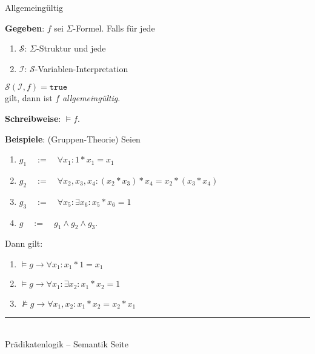 \documentclass{slides}
\newcommand{\myrule}{\rule{20cm}{1mm}\\ }
\newcommand{\struct}{\mathcal{S}}
\newcounter{mypage}
\begin{document}
\begin{slide}{}
\normalsize

\begin{center}
Allgemeing\"{u}ltig
\end{center}
\vspace{0.5cm}

\footnotesize
\textbf{Gegeben}: $f$ sei $\Sigma$-Formel. Falls f\"{u}r jede
\begin{enumerate}
\item $\struct$: \quad  $\Sigma$-Struktur und jede
\item  $\mathcal{I}$: \quad $\struct$-Variablen-Interpretation
\end{enumerate}
\hspace*{1.3cm} $\struct(\mathcal{I}, f) = \mathtt{true}$ \\[0.3cm]
gilt, dann ist  $f$  \emph{allgemeing\"{u}ltig}.  

\textbf{Schreibweise}:
\hspace*{1.3cm} $\models f$. 

\textbf{Beispiele}: (Gruppen-Theorie) Seien
\begin{enumerate}
  \item $g_1 \quad := \quad \forall x_1: 1 * x_1 = x_1$
  \item $g_2 \quad := \quad \forall x_2, x_3, x_4: (x_2 * x_3) * x_4 = x_2 * (x_3 * x_4)$
  \item $g_3 \quad := \quad \forall x_5: \exists x_6: x_5 * x_6 = 1$
  \item $g \quad := \quad g_1 \wedge g_2 \wedge g_3$.
\end{enumerate}
Dann gilt:
\begin{enumerate}
\item $\models g \rightarrow \forall x_{1}: x_{1} * 1 = x_{1}$
\item $\models g \rightarrow \forall x_{1}: \exists x_{2}: x_{1} * x_{2} = 1$
\item $\not\models g \rightarrow \forall x_{1}, x_{2}: x_{1} * x_{2} = x_{2} * x_{1}$
\end{enumerate}

\vspace*{\fill}
\tiny \addtocounter{mypage}{1}
\myrule
Pr\"{a}dikatenlogik -- Semantik  \hspace*{\fill} Seite 
\end{slide}

\end{document}

